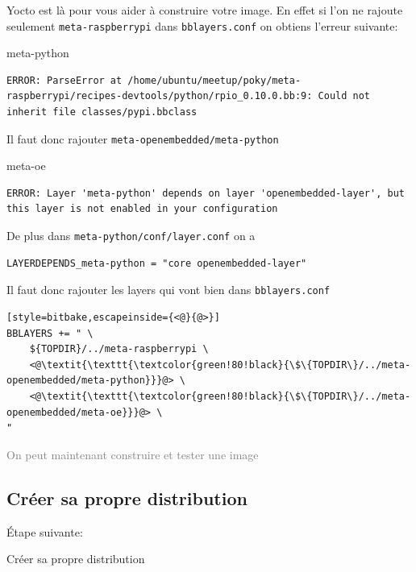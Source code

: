 \documentclass[compress]{smilebeamer}
\begin{document}
\begin{frame}[fragile]
Yocto est là pour vous aider à construire votre image.\newline
En effet si l'on ne rajoute seulement \texttt{meta-raspberrypi} dans \texttt{bblayers.conf} on obtiens l'erreur suivante:
\begin{block}{meta-python}
\begin{lstlisting}[basicstyle=\footnotesize\ttfamily\color{red!80!black!60}]
ERROR: ParseError at /home/ubuntu/meetup/poky/meta-raspberrypi/recipes-devtools/python/rpio_0.10.0.bb:9: Could not inherit file classes/pypi.bbclass
\end{lstlisting}
Il faut donc rajouter \texttt{meta-openembedded/meta-python}
\end{block}
\begin{block}{meta-oe}
\begin{lstlisting}[basicstyle=\footnotesize\ttfamily\color{red!80!black!60}]
ERROR: Layer 'meta-python' depends on layer 'openembedded-layer', but this layer is not enabled in your configuration
\end{lstlisting}
De plus dans \texttt{meta-python/conf/layer.conf} on a
\begin{lstlisting}[style=bitbake]
LAYERDEPENDS_meta-python = "core openembedded-layer"
\end{lstlisting}
\end{block}
\end{frame}

\begin{frame}[fragile]
Il faut donc rajouter les layers qui vont bien dans \texttt{bblayers.conf}
\begin{lstlisting}[style=bitbake,escapeinside={<@}{@>}]
BBLAYERS += " \
    ${TOPDIR}/../meta-raspberrypi \
    <@\textit{\texttt{\textcolor{green!80!black}{\$\{TOPDIR\}/../meta-openembedded/meta-python}}}@> \
    <@\textit{\texttt{\textcolor{green!80!black}{\$\{TOPDIR\}/../meta-openembedded/meta-oe}}}@> \
"
\end{lstlisting}
\textcolor{gray}{On peut maintenant construire et tester une image}
\end{frame}


\subsection{Créer sa propre distribution}
\begin{frame}
\begin{center}
\textcolor{smileOrange}{\huge{Étape suivante:}}
\end{center}
\begin{center}
\textcolor{smileOrange}{\huge{Créer sa propre distribution}}
\end{center}
\end{frame}
\end{document}
